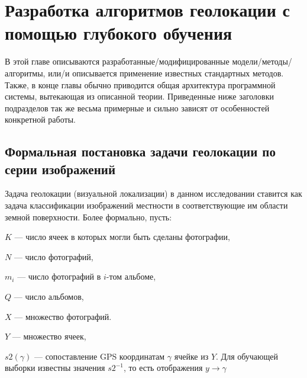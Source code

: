  \chapter{Разработка алгоритмов геолокации с помощью глубокого обучения}\label{chapter2}

В этой главе описываются разработанные/модифицированные модели/методы/
алгоритмы, или/и описывается применение известных стандартных методов. Также, 
в конце главы обычно приводится общая архитектура программной системы, 
вытекающая из описанной теории. Приведенные ниже заголовки подразделов так же 
весьма примерные и сильно зависят от особенностей конкретной работы.
\section{Формальная постановка задачи геолокации по серии изображений}

Задача геолокации (визуальной локализации) в данном исследовании ставится как задача классификации изображений местности в соответствующие им области земной поверхности. Более формально, пусть:

\begin{compactitem}
	\item $K$ --- число ячеек в которых могли быть сделаны фотографии,
	\item $N$ --- число фотографий,
	\item $m_i$ --- число фотографий в $i$-том альбоме,
	\item $ Q $ --- число альбомов,
	\item $X$ --- множество фотографий. 
	\item $ Y $ --- множество ячеек, 
	\item $ s2(\gamma) $ --- сопоставление GPS координатам $ \gamma $ ячейке из $ Y $. Для обучающей выборки известны значения $ s2^{-1} $, то есть отображения $ y \to \gamma $
\end{compactitem}

